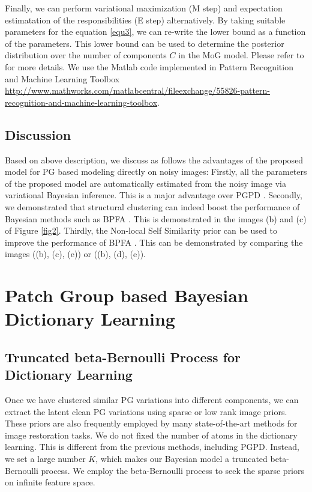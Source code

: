 \documentclass[runningheads]{llncs}
\begin{document}
Finally, we can perform variational maximization (M step) and expectation estimatation of the responsibilities (E step) alternatively. By taking suitable parameters for the equation \ref{equ3}, we can re-write the lower bound as a function of the parameters. This lower bound can be used to determine the posterior distribution over the number of components $C$ in the MoG model. Please refer to \cite{prml} for more details. We use the Matlab code implemented in Pattern Recognition and Machine Learning Toolbox \url{http://www.mathworks.com/matlabcentral/fileexchange/55826-pattern-recognition-and-machine-learning-toolbox}.
\vspace{-0.1in}

\subsection{Discussion}
Based on above description, we discuss as follows the advantages of the proposed model for PG based modeling directly on noisy images: Firstly, all the parameters of the proposed model are automatically estimated from the noisy image via variational Bayesian inference. This is a major advantage over PGPD \cite{pgpd}. Secondly, we demonstrated that structural clustering can indeed boost the performance of Bayesian methods such as BPFA \cite{bpfa}. This is demonstrated in the images (b) and (c) of Figure \ref{fig2}. Thirdly, the Non-local Self Similarity prior can be used to improve the performance of BPFA \cite{bpfa}. This can be demonstrated by comparing the images ((b), (c), (e)) or ((b), (d), (e)).
\vspace{-0.1in}

\section{Patch Group based Bayesian Dictionary Learning}
\subsection{Truncated beta-Bernoulli Process for Dictionary Learning}
\vspace{-0.1in}
Once we have clustered similar PG variations into different components, we can extract the latent clean PG variations using sparse or low rank image priors. These priors are also frequently employed by many state-of-the-art methods \cite{bm3d,lssc,epll,ncsr,wnnm,pgpd} for image restoration tasks. We do not fixed the number of atoms in the dictionary learning. This is different from the previous methods, including PGPD. Instead, we set a large number $K$, which makes our Bayesian model a truncated beta-Bernoulli process. We employ the beta-Bernoulli process \cite{hjort1990,thibaux2007,paisley2009} to seek the sparse priors on infinite feature space.
\end{document}
